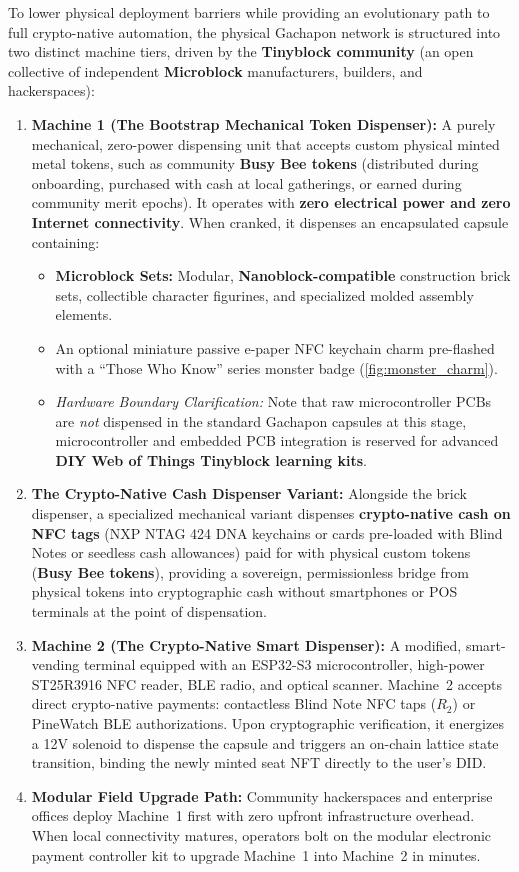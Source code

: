\documentclass[a4paper,11pt,twoside,parskip=half-,headings=small]{scrartcl}
\begin{document}
To lower physical deployment barriers while providing an evolutionary path to full crypto-native automation,
the physical Gachapon network is structured into two distinct machine tiers, driven by the \textbf{Tinyblock community} (an open collective of independent \textbf{Microblock} manufacturers, builders, and hackerspaces):
\begin{enumerate}
  \item \textbf{Machine 1 (The Bootstrap Mechanical Token Dispenser):}
  A purely mechanical, zero-power dispensing unit that accepts custom physical minted metal tokens, such as community \textbf{Busy Bee tokens} (distributed during onboarding, purchased with cash at local gatherings, or earned during community merit epochs). It operates with \textbf{zero electrical power and zero Internet connectivity}. When cranked, it dispenses an encapsulated capsule containing:
  \begin{itemize}[nosep]
    \item \textbf{Microblock Sets:} Modular, \textbf{Nanoblock-compatible} construction brick sets, collectible character figurines, and specialized molded assembly elements.
    \item An optional miniature passive e-paper NFC keychain charm pre-flashed with a ``Those Who Know'' series monster badge (\cref{fig:monster_charm}).
    \item \emph{Hardware Boundary Clarification:} Note that raw microcontroller PCBs are \emph{not} dispensed in the standard Gachapon capsules at this stage, microcontroller and embedded PCB integration is reserved for advanced \textbf{DIY Web of Things Tinyblock learning kits}.
  \end{itemize}
  \item \textbf{The Crypto-Native Cash Dispenser Variant:}
  Alongside the brick dispenser, a specialized mechanical variant dispenses \textbf{crypto-native cash on NFC tags} (NXP NTAG 424 DNA keychains or cards pre-loaded with Blind Notes or seedless cash allowances) paid for with physical custom tokens (\textbf{Busy Bee tokens}), providing a sovereign, permissionless bridge from physical tokens into cryptographic cash without smartphones or POS terminals at the point of dispensation.
  \item \textbf{Machine 2 (The Crypto-Native Smart Dispenser):}
  A modified, smart-vending terminal equipped with an ESP32-S3 microcontroller, high-power ST25R3916 NFC reader, BLE radio, and optical scanner.
Machine~2 accepts direct crypto-native payments: contactless Blind Note NFC taps ($R_2$) or PineWatch BLE authorizations.
Upon cryptographic verification, it energizes a 12V solenoid to dispense the capsule and triggers an on-chain lattice state transition,
binding the newly minted seat NFT directly to the user's DID.
  \item \textbf{Modular Field Upgrade Path:} Community hackerspaces and enterprise offices deploy Machine~1 first with zero upfront
infrastructure overhead. When local connectivity matures, operators bolt on the modular electronic payment controller kit to upgrade
Machine~1 into Machine~2 in minutes.
\end{enumerate}
\end{document}
